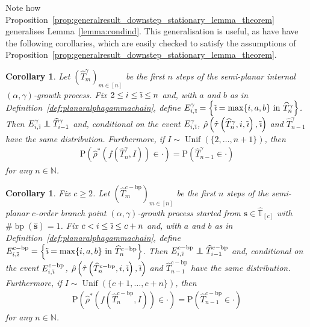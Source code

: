 \documentclass[a4paper, final]{amsart}
\theoremstyle{plain}
\newtheorem{cor}[thm]{Corollary}
\theoremstyle{definition}
\newcommand{\tree}[1][t]{\boldsymbol{#1}}
\newcommand{\that}[1][t]{\hat{\boldsymbol{#1}}} %
\newcommand{\That}[1][T]{\widehat{#1}}
\newcommand{\Thatspace}[1][\T]{\widehat{\boldsymbol{#1}}} %
\newcommand{\T}{\mathbb{T}}
\DeclareMathOperator{\branchpoints}{bp}
\DeclareMathOperator{\tildei}{\tilde{\textit{\i}}}
\newcommand\independent{\protect\mathpalette{\protect\independenT}{\perp}}
\def\independenT#1#2{\mathrel{\rlap{$#1#2$}\mkern2mu{#1#2}}}
\renewcommand{\P}{\mathrm{P}}
\newcommand{\N}{\mathbb{N}}
\DeclareMathOperator{\Unif}{Unif}
\begin{document}
%
Note how Proposition~\ref{prop:generalresult_downstep_stationary_lemma_theorem} generalises Lemma~\ref{lemma:condind}.
This generalisation is useful, as have have the following corollaries, which are easily checked to satisfy the assumptions of Proposition~\ref{prop:generalresult_downstep_stationary_lemma_theorem}.
%
\begin{cor}%
\label{cor:internal_downupchain_stationary_lemma_theorem}
  Let ${\left( \That_m^\gamma \right)}_{m \in [n]}$ be the first $n$ steps of the semi-planar internal $(\alpha, \gamma)$-growth process.
Fix $2 \leq i \leq \tildei \leq n$ and, with $a$ and $b$ as in Definition~\ref{def:planaralphagammachain}, define $E_{i, \tildei}^\gamma = \left\{ \tildei = \max \{i, a, b\}\ \text{in}\ \That_n^\gamma \right\}$.
  Then $E_{i, \tildei}^\gamma \independent \That_{i-1}^\gamma$ and, conditional on the event $E_{i, \tildei}^\gamma$, $\hat{\rho} \left( \hat{\tau} \left( \That_n^\gamma, i, \tildei \right), \tildei \right)$ and $\That_{n-1}^\gamma$ have the same distribution.
  Furthermore, if $I \sim \Unif \left( \{2, \ldots, n + 1\} \right)$, then
  \begin{align}
    \P \left( \hat{\rho}^* \left( f\left( \That_n^\gamma, I \right) \right) \in \cdot \right) = \P \left( \That_{n-1}^\gamma \in \cdot \right)
    \label{eq:internal_downupchain_downstepdistribution}
  \end{align}
  for any $n \in \N$.
\end{cor}
%
\begin{cor}%
\label{cor:korder_downupchain_stationary_lemma_theorem} 
  Fix $c \geq2$.
  Let ${\left( \That_m^{c-\text{bp}} \right)}_{m \in [n]}$ be the first $n$ steps of the semi-planar $c$-order branch point $(\alpha, \gamma)$-growth process started from $\that[s] \in \Thatspace_{[c]}$ with $\# \branchpoints (\that[s]) = 1$.
  Fix $c < i \leq \tildei \leq c + n$ and, with $a$ and $b$ as in Definition~\ref{def:planaralphagammachain}, define $E_{i, \tildei}^{c-\text{bp}} = \left\{ \tildei = \max \{i, a, b\}\ \text{in}\ \That_n^{c-\text{bp}} \right\}$.
  Then $E_{i, \tildei}^{c-\text{bp}} \independent \That_{i-1}^{c-\text{bp}}$ and, conditional on the event $E_{i, \tildei}^{c-\text{bp}}$, $\hat{\rho} \left( \hat{\tau} \left( \That_n^{c-\text{bp}}, i, \tildei \right), \tildei \right)$ and $\That_{n-1}^{c-\text{bp}}$ have the same distribution.
  Furthermore, if $I \sim \Unif \left( \{ c + 1, \ldots, c + n\} \right)$, then
  \begin{align}
    \P \left( \hat{\rho}^* \left( f\left( \That_n^{c-\text{bp}}, I \right) \right) \in \cdot \right) = \P \left( \That_{n-1}^{c-\text{bp}} \in \cdot \right)
    \label{eq:korder_downupchain_downstepdistribution}
  \end{align}
  for any $n \in \N$.
\end{cor}
\end{document}
